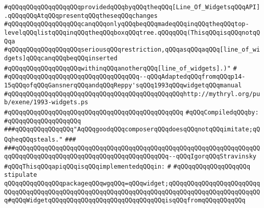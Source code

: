 \verb|#qQQqqQQqqQQqqQQqqQQqprovidedqQQqbyqQQqtheqQQq[Line_Of_WidgetsqQQqAPI].qQQqqQQqAtqQQqpresentqQQqtheseqQQqchanges|\newline
\verb|#qQQqqQQqqQQqqQQqqQQqcanqQQqonlyqQQqbeqQQqmadeqQQqinqQQqtheqQQqtop-levelqQQqlistqQQqinqQQqtheqQQqboxqQQqtree.qQQqqQQq(ThisqQQqisqQQqnotqQQqa|\newline
\verb|#qQQqqQQqqQQqqQQqqQQqseriousqQQqrestriction,qQQqasqQQqaqQQq[line_of_widgets]qQQqcanqQQqbeqQQqinserted|\newline
\verb|#qQQqqQQqqQQqqQQqqQQqwithinqQQqanotherqQQq[line_of_widgets].)"|\newline
\verb|#|\newline
\verb|#qQQqqQQqqQQqqQQqqQQqqQQqqQQqqQQqqQQq--qQQqAdaptedqQQqfromqQQqp14-15qQQqofqQQqGansnerqQQqandqQQqReppy'sqQQq1993qQQqwidgetqQQqmanual|\newline
\verb|#qQQqqQQqqQQqqQQqqQQqqQQqqQQqqQQqqQQqqQQqqQQqqQQqhttp://mythryl.org/pub/exene/1993-widgets.ps|\newline
\verb|#qQQqqQQqqQQqqQQqqQQqqQQqqQQqqQQqqQQqqQQqqQQqqQQq|\newline
\newline
\verb|#qQQqCompiledqQQqby:|\newline
\verb|#qQQqqQQqqQQqqQQqqQQq|\newline
\newline
\newline
\newline
\newline
\newline
\verb|###qQQqqQQqqQQqqQQq"AqQQqgoodqQQqcomposerqQQqdoesqQQqnotqQQqimitate;qQQqheqQQqsteals."|\newline
\verb|###|\newline
\verb|###qQQqqQQqqQQqqQQqqQQqqQQqqQQqqQQqqQQqqQQqqQQqqQQqqQQqqQQqqQQqqQQqqQQqqQQqqQQqqQQqqQQqqQQqqQQqqQQqqQQqqQQqqQQqqQQq--qQQqIgorqQQqStravinsky|\newline
\newline
\verb|#qQQqThisqQQqapiqQQqisqQQqimplementedqQQqin:|\newline
\verb|#|\newline
\verb|#qQQqqQQqqQQqqQQqqQQq|\newline
\newline
\verb|stipulate|\newline
\verb|qQQqqQQqqQQqqQQqpackageqQQqwgqQQq=qQQqwidget;qQQqqQQqqQQqqQQqqQQqqQQqqQQqqQQqqQQqqQQqqQQqqQQqqQQqqQQqqQQqqQQqqQQqqQQqqQQqqQQqqQQqqQQqqQQqqQQq#qQQqWidgetqQQqqQQqqQQqqQQqqQQqqQQqqQQqqQQqisqQQqfromqQQqqQQqqQQq|\newline

